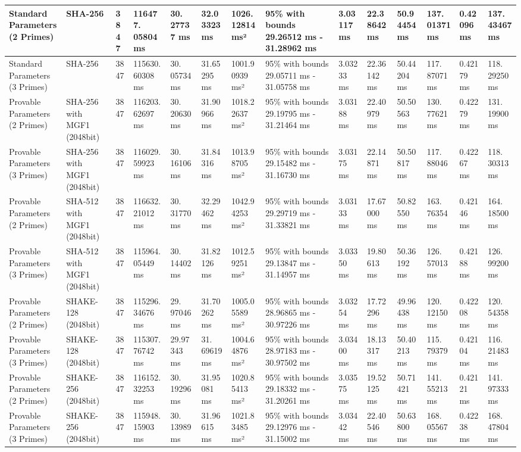 \documentclass[]{final_report}
\theoremstyle{definition}
\begin{document}
\begin{landscape}
\begin{longtable}{|p{2.3cm}|p{1.8cm}|p{1.0cm}|p{1.7cm}|p{1.2cm}|p{1.5cm}|p{1.8cm}|p{1.5cm}|p{1.2cm}|p{1.5cm}|p{1.3cm}|p{1.2cm}|p{1.3cm}|p{1.3cm}|}
\hline
\endlastfoot
Standard Parameters (2 Primes) & SHA-256 & 3847 & 116477.
05804 ms & 30.
27737 ms & 32.03323 ms & 1026.12814 ms² & 95\% with bounds 29.26512 ms - 31.28962 ms & 3.03117 ms & 22.38642 ms & 50.94454 ms & 137.
01371 ms & 0.42096 ms & 137.
43467 ms \\
\hline
Standard Parameters (3 Primes) & SHA-256 & 3847 & 115630.
60308 ms & 30.
05734 ms & 31.65295 ms & 1001.90939 ms² & 95\% with bounds 29.05711 ms - 31.05758 ms & 3.03233 ms & 22.36142 ms & 50.44204 ms & 117.
87071 ms & 0.42179 ms & 118.
29250 ms \\
\hline
Provable Parameters (2 Primes) & SHA-256 with MGF1 (2048bit) & 3847 & 116203.
62697 ms & 30.
20630 ms & 31.90966 ms & 1018.22637 ms² & 95\% with bounds 29.19795 ms - 31.21464 ms & 3.03188 ms & 22.40979 ms & 50.50563 ms & 130.
77621 ms & 0.42279 ms & 131.
19900 ms \\
\hline
Provable Parameters (3 Primes) & SHA-256 with MGF1 (2048bit) & 3847 & 116029.
59923 ms & 30.
16106 ms & 31.84316 ms & 1013.98705 ms² & 95\% with bounds 29.15482 ms - 31.16730 ms & 3.03175 ms & 22.14871 ms & 50.50817 ms & 117.
88046 ms & 0.42267 ms & 118.
30313 ms \\
\hline
Provable Parameters (2 Primes) & SHA-512 with MGF1 (2048bit) & 3847 & 116632.
21012 ms & 30.
31770 ms & 32.29462 ms & 1042.94253 ms² & 95\% with bounds 29.29719 ms - 31.33821 ms & 3.03133 ms & 17.67000 ms & 50.82550 ms & 163.
76354 ms & 0.42146 ms & 164.
18500 ms \\
\hline
Provable Parameters (3 Primes) & SHA-512 with MGF1 (2048bit) & 3847 & 115964.
05449 ms & 30.
14402 ms & 31.82126 ms & 1012.59251 ms² & 95\% with bounds 29.13847 ms - 31.14957 ms & 3.03350 ms & 19.80613 ms & 50.36192 ms & 126.
57013 ms & 0.42188 ms & 126.
99200 ms \\
\hline
Provable Parameters (2 Primes) & SHAKE-128 (2048bit) & 3847 & 115296.
34676 ms & 29.
97046 ms & 31.70262 ms & 1005.05589 ms² & 95\% with bounds 28.96865 ms - 30.97226 ms & 3.03254 ms & 17.72296 ms & 49.96438 ms & 120.
12150 ms & 0.42208 ms & 120.
54358 ms \\
\hline
Provable Parameters (3 Primes) & SHAKE-128 (2048bit) & 3847 & 115307.
76742 ms & 29.97343 ms & 31.
69619 ms & 1004.64876 ms² & 95\% with bounds 28.97183 ms - 30.97502 ms & 3.03400 ms & 18.13317 ms & 50.40213 ms & 115.
79379 ms & 0.42104 ms & 116.
21483 ms \\
\hline
Provable Parameters (2 Primes) & SHAKE-256 (2048bit) & 3847 & 116152.
32253 ms & 30.
19296 ms & 31.95081 ms & 1020.85413 ms² & 95\% with bounds 29.18332 ms - 31.20261 ms & 3.03575 ms & 19.52125 ms & 50.71421 ms & 141.
55213 ms & 0.42121 ms & 141.
97333 ms \\
\hline
Provable Parameters (3 Primes) & SHAKE-256 (2048bit) & 3847 & 115948.
15903 ms & 30.
13989 ms & 31.96615 ms & 1021.83485 ms² & 95\% with bounds 29.12976 ms - 31.15002 ms & 3.03442 ms & 22.40546 ms & 50.63800 ms & 168.
05567 ms & 0.42238 ms & 168.
47804 ms \\
\hline


\end{longtable}
\end{landscape}
\end{document}

